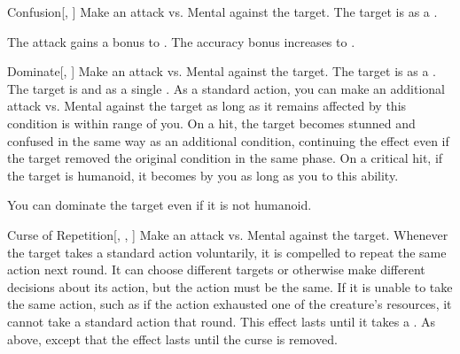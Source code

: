 \lowercase{\hypertarget{spell:Confusion}{}}\label{spell:Confusion}
\begin{freeability}[Rank 5]{\hypertarget{spell:Confusion}{Confusion}}[, ]
Make an attack vs. Mental against the target.
\hit The target is \confused as a .

\rankline
{} The attack gains a  bonus to .
 The accuracy bonus increases to .
\end{freeability}
\vspace{0.25em}



\lowercase{\hypertarget{spell:Dominate}{}}\label{spell:Dominate}
\begin{freeability}[Rank 5]{\hypertarget{spell:Dominate}{Dominate}}[, ]
Make an attack vs. Mental against the target.
\hit The target is  as a .
\crit The target is  and  as a single .
As a standard action, you can make an additional attack vs. Mental against the target as long as it remains affected by this condition is within \rngmed range of you.
On a hit, the target becomes stunned and confused in the same way as an additional condition, continuing the effect even if the target removed the original condition in the same phase.
On a critical hit, if the target is humanoid, it becomes  by you as long as you  to this ability.

\rankline
{} You can dominate the target even if it is not humanoid.
\end{freeability}
\vspace{0.25em}



\lowercase{\hypertarget{spell:Curse of Repetition}{}}\label{spell:Curse of Repetition}
\begin{freeability}[Rank 6]{\hypertarget{spell:Curse of Repetition}{Curse of Repetition}}[, , ]
Make an attack vs. Mental against the target.
\hit Whenever the target takes a standard action voluntarily, it is compelled to repeat the same action next round.
It can choose different targets or otherwise make different decisions about its action, but the action must be the same.
If it is unable to take the same action, such as if the action exhausted one of the creature's resources, it cannot take a standard action that round.
This effect lasts until it takes a .
\crit As above, except that the effect lasts until the curse is removed.
\end{freeability}
\vspace{0.25em}



